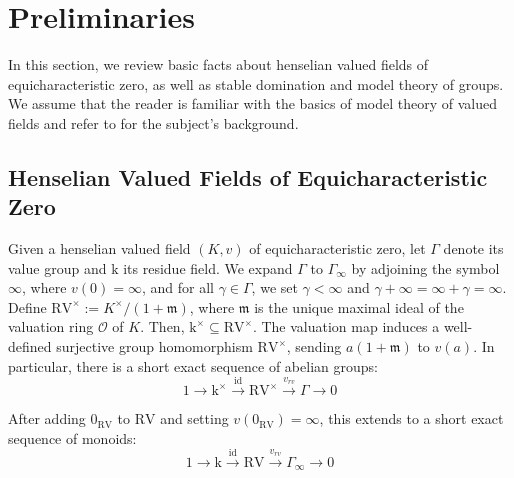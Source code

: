 \documentclass[12pt]{article}
\newcommand{\rv}{\mathrm{RV}}
\newcommand{\val}{\textit{v}}
\newcommand{\0}{\emptyset}
\newcommand{\rf}{\mathrm{k}}
\theoremstyle{plain}%
\theoremstyle{definition}
\theoremstyle{remark}
\begin{document}
\section{Preliminaries}\label{Preliminaries}
In this section, we review basic facts about henselian valued fields of equicharacteristic zero, as well as stable domination and model theory of groups. We assume that the reader is familiar with the basics of model theory of valued fields and refer to \cite{Mar18} for the subject's background.


\subsection{Henselian Valued Fields of Equicharacteristic Zero}

Given a henselian valued field $(K, v)$ of equicharacteristic zero, let $\Gamma$ denote its value group and $\rf$ its residue field. We expand $\Gamma$ to $\Gamma_{\infty}$ by adjoining the symbol $\infty$, where $\val(0) = \infty$, and for all $\gamma \in \Gamma$, we set $\gamma < \infty$ and $\gamma + \infty = \infty + \gamma = \infty$. Define $\rv^{\times} := K^{\times} / (1 + \mathfrak{m})$, where $\mathfrak{m}$ is the unique maximal ideal of the valuation ring $\mathcal{O}$ of $K$. Then, $\rf^{\times}\subseteq \rv^{\times}$. The valuation map induces a well-defined surjective group homomorphism $\rv^{\times}$, sending $a(1+\mathfrak{m})$ to $\val(a)$. In particular, there is a short exact sequence of abelian groups:
$$
1 \longrightarrow \rf^{\times}
 \xrightarrow{\mathrm{id}} \rv^{\times}
 \xrightarrow{\val_{rv}} \Gamma
 \longrightarrow 0
$$



After adding $0_{\rv}$ to $\rv$ and setting $\val(0_{\rv}) = \infty$, this extends to a short exact sequence of monoids:
$$
1 \longrightarrow \rf
 \xrightarrow{\mathrm{id}} \rv
 \xrightarrow{\val_{rv}} \Gamma_{\infty}
 \longrightarrow 0
$$
\end{document}
